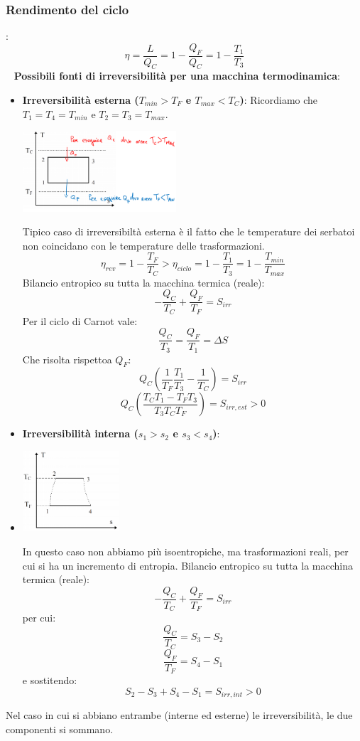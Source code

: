 \subsubsection{Rendimento del ciclo}:
\[
    \eta = \frac{L}{Q_C} = 1-\frac{Q_F}{Q_C} = 1- \frac{T_1}{T_3}    
\]
\ \newline
\newline
\textbf{Possibili fonti di irreversibilità per una macchina termodinamica}:
\begin{itemize}
    \item \textbf{Irreversibilità esterna ($T_{min} > T_F$ e $T_{max} < T_C$)}:\newline
    Ricordiamo che $T_1 = T_4 = T_{min}$ e $T_2 = T_3 = T_{max}$.
    \begin{center}
        \includegraphics[height=3cm]{../L07/img3.PNG}
    \end{center}
    Tipico caso di irreversibiltà esterna è il fatto che le temperature dei serbatoi non coincidano con le temperature delle trasformazioni.
    \[
        \eta_{rev} = 1-\frac{T_F}{T_C} > \eta_{ciclo} = 1- \frac{T_1}{T_3} = 1- \frac{T_{min}}{T_{max}}
    \]
    Bilancio entropico su tutta la macchina termica (reale):
    \[
        -\frac{Q_C}{T_C} + \frac{Q_F}{T_F} = S_{irr}
    \]
    Per il ciclo di Carnot vale:
    \[
        \frac{Q_C}{T_3} = \frac{Q_F}{T_1} = \Delta S
    \]
    Che risolta rispettoa $Q_F$:
    \[
        Q_C\left(\frac{1}{T_F} \frac{T_1}{T_3} - \frac{1}{T_C}\right) = S_{irr}
    \]
    \[
        Q_C \left(\frac{T_C T_1 - T_F T_3}{T_3T_CT_F}\right) = S_{irr, est} > 0
    \]
    \item \textbf{Irreversibilità interna ($s_1 > s_2$ e $s_3 < s_4$)}:
    \item \begin{center}
        \includegraphics[height=3cm]{../L07/img4.PNG}
    \end{center}
    In questo caso non abbiamo più isoentropiche, ma trasformazioni reali, per cui si ha un incremento di entropia.\newline
    Bilancio entropico su tutta la macchina termica (reale):
    \[
        - \frac{Q_C}{T_C} + \frac{Q_F}{T_F} = S_{irr}
    \]
    per cui:
    \[
        \frac{Q_C}{T_C} = S_3 - S_2
    \]
    \[
        \frac{Q_F}{T_F} = S_4 - S_1
    \]
    e sostitendo:
    \[
        S_2-S_3 +S_4 -S_1 = S_{irr, int} > 0
    \]
\end{itemize}
Nel caso in cui si abbiano entrambe (interne ed esterne) le irreversibilità, le due componenti si sommano.
